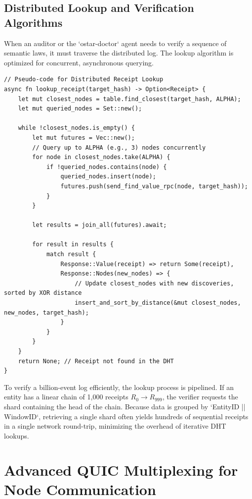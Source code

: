 \subsection{Distributed Lookup and Verification Algorithms}

When an auditor or the `ostar-doctor` agent needs to verify a sequence of semantic laws, it must traverse the distributed log. The lookup algorithm is optimized for concurrent, asynchronous querying.

\begin{verbatim}
// Pseudo-code for Distributed Receipt Lookup
async fn lookup_receipt(target_hash) -> Option<Receipt> {
    let mut closest_nodes = table.find_closest(target_hash, ALPHA);
    let mut queried_nodes = Set::new();
    
    while !closest_nodes.is_empty() {
        let mut futures = Vec::new();
        // Query up to ALPHA (e.g., 3) nodes concurrently
        for node in closest_nodes.take(ALPHA) {
            if !queried_nodes.contains(node) {
                queried_nodes.insert(node);
                futures.push(send_find_value_rpc(node, target_hash));
            }
        }
        
        let results = join_all(futures).await;
        
        for result in results {
            match result {
                Response::Value(receipt) => return Some(receipt),
                Response::Nodes(new_nodes) => {
                    // Update closest_nodes with new discoveries, sorted by XOR distance
                    insert_and_sort_by_distance(&mut closest_nodes, new_nodes, target_hash);
                }
            }
        }
    }
    return None; // Receipt not found in the DHT
}
\end{verbatim}

To verify a billion-event log efficiently, the lookup process is pipelined. If an entity has a linear chain of 1,000 receipts $R_0 \rightarrow R_{999}$, the verifier requests the shard containing the head of the chain. Because data is grouped by `EntityID || WindowID`, retrieving a single shard often yields hundreds of sequential receipts in a single network round-trip, minimizing the overhead of iterative DHT lookups.

\section{Advanced QUIC Multiplexing for Node Communication}

